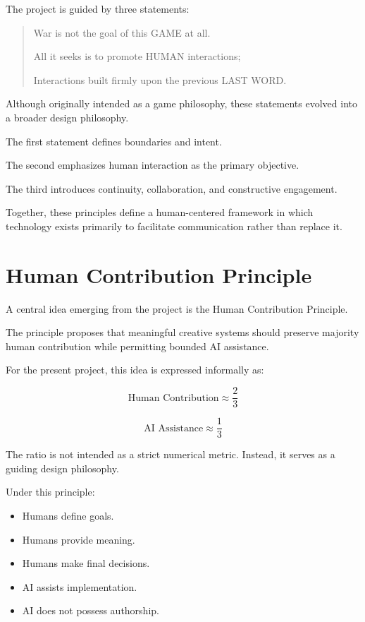 \documentclass[11pt]{article}
\begin{document}
The project is guided by three statements:

\begin{quote}
War is not the goal of this GAME at all.

All it seeks is to promote HUMAN interactions;

Interactions built firmly upon the previous LAST WORD.
\end{quote}

Although originally intended as a game philosophy, these statements evolved into a broader design philosophy.

The first statement defines boundaries and intent.

The second emphasizes human interaction as the primary objective.

The third introduces continuity, collaboration, and constructive engagement.

Together, these principles define a human-centered framework in which technology exists primarily to facilitate communication rather than replace it.

\section{Human Contribution Principle}

A central idea emerging from the project is the Human Contribution Principle.

The principle proposes that meaningful creative systems should preserve majority human contribution while permitting bounded AI assistance.

For the present project, this idea is expressed informally as:

\begin{equation}
\text{Human Contribution} \approx \frac{2}{3}
\end{equation}

\begin{equation}
\text{AI Assistance} \approx \frac{1}{3}
\end{equation}

The ratio is not intended as a strict numerical metric. Instead, it serves as a guiding design philosophy.

Under this principle:

\begin{itemize}
\item Humans define goals.
\item Humans provide meaning.
\item Humans make final decisions.
\item AI assists implementation.
\item AI does not possess authorship.
\end{itemize}
\end{document}
